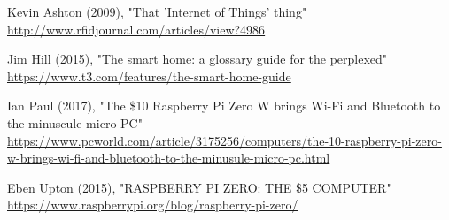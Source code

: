 \begin{thebibliography}{99}

Kevin Ashton (2009), "That 'Internet of Things' thing"\\
\url{http://www.rfidjournal.com/articles/view?4986}

Jim Hill (2015), "The smart home: a glossary guide for the perplexed"\\
\url{https://www.t3.com/features/the-smart-home-guide}

Ian Paul (2017), "The \$10 Raspberry Pi Zero W brings Wi-Fi and Bluetooth to the minuscule micro-PC"\\
\url{https://www.pcworld.com/article/3175256/computers/the-10-raspberry-pi-zero-w-brings-wi-fi-and-bluetooth-to-the-minusule-micro-pc.html}

Eben Upton (2015), "RASPBERRY PI ZERO: THE \$5 COMPUTER"\\
\url{https://www.raspberrypi.org/blog/raspberry-pi-zero/}

\end{thebibliography}